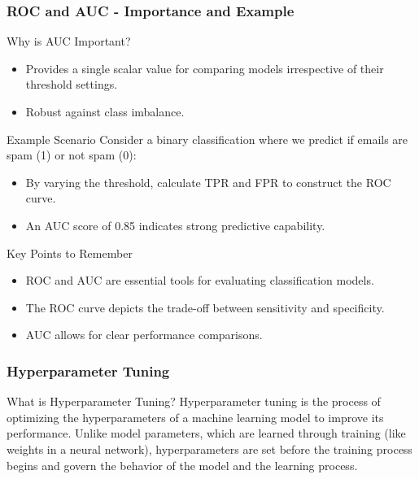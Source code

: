 \documentclass{beamer}
\begin{document}
\begin{frame}[fragile]
    \frametitle{ROC and AUC - Importance and Example}
    \begin{block}{Why is AUC Important?}
        \begin{itemize}
            \item Provides a single scalar value for comparing models irrespective of their threshold settings.
            \item Robust against class imbalance.
        \end{itemize}
    \end{block}

    \begin{block}{Example Scenario}
        Consider a binary classification where we predict if emails are spam (1) or not spam (0):
        \begin{itemize}
            \item By varying the threshold, calculate TPR and FPR to construct the ROC curve.
            \item An AUC score of 0.85 indicates strong predictive capability.
        \end{itemize}
    \end{block}
    
    \begin{block}{Key Points to Remember}
        \begin{itemize}
            \item ROC and AUC are essential tools for evaluating classification models.
            \item The ROC curve depicts the trade-off between sensitivity and specificity.
            \item AUC allows for clear performance comparisons.
        \end{itemize}
    \end{block}
\end{frame}

\begin{frame}[fragile]
    \frametitle{Hyperparameter Tuning}
    \begin{block}{What is Hyperparameter Tuning?}
        Hyperparameter tuning is the process of optimizing the hyperparameters of a machine learning model to improve its performance. Unlike model parameters, which are learned through training (like weights in a neural network), hyperparameters are set before the training process begins and govern the behavior of the model and the learning process.
    \end{block}
\end{frame}
\end{document}
